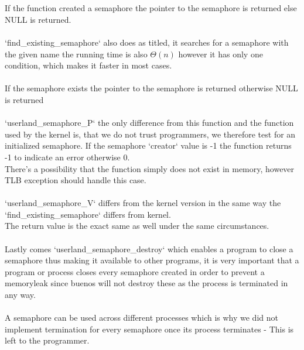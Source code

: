 \documentclass[a4paper,12pt,danish]{report}
\begin{document}
\\
\\
If the function created a semaphore the pointer to the semaphore is returned else NULL is returned.
\\
\\
`find\_existing\_semaphore` also does as titled, it searches for a semaphore with the given name the running time is also $\Theta(n)$ however it has only one condition, which makes it faster in most cases.
\\
\\
If the semaphore exists the pointer to the semaphore is returned otherwise NULL is returned
\\
\\
`userland\_semaphore\_P` the only difference from this function and the function used by the kernel is, that we do not trust programmers, we therefore test for an initialized semaphore. If the semaphore `creator` value is -1 the function returns -1 to indicate an error otherwise 0.
\\
There's a possibility that the function simply does not exist in memory, however TLB exception should handle this case.
\\
\\
`userland\_semaphore\_V` differs from the kernel version in the same way the `find\_existing\_semaphore` differs from kernel.
\\
The return value is the exact same as well under the same circumstances.
\\
\\
Lastly comes `userland\_semaphore\_destroy` which enables a program to close a semaphore thus making it available to other programs, it is very important that a program or process closes every semaphore created in order to prevent a memoryleak since buenos will not destroy these as the process is terminated in any way.
\\
\\
A semaphore can be used across different processes which is why we did not implement termination for every semaphore once its process terminates - This is left to the programmer.
\end{document}
